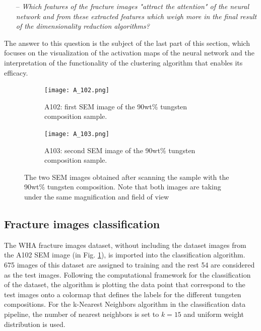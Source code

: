\documentclass[authoryear,preprint,review,12pt, singleside]{elsarticle}
\begin{document}
\begin{itemize}
	\item[--] \textit{Which features of the fracture images "attract the attention" of the neural network and from these extracted features which weigh more in the final result of the dimensionality reduction algorithms?}
\end{itemize}
     
The answer to this question is the subject of the last part of this section, which focuses on the visualization of the activation maps of the neural network and the interpretation of the functionality of the clustering algorithm that enables its efficacy.


\begin{figure}[!h]
	\centering
	\begin{subfigure}[b]{0.49\textwidth}
		\centering
		\texttt{[image: A\_102.png]}
		\caption{A102: first SEM image of the 90wt\% tungsten composition sample.}
		\label{fig:A_102}
	\end{subfigure}
	\begin{subfigure}[b]{0.49\textwidth}
		\centering
		\texttt{[image: A\_103.png]}
		\caption{A103: second SEM image of the 90wt\% tungsten composition sample.}
		\label{fig:A_103}
	\end{subfigure}
	\caption{The two SEM images obtained after scanning the sample with the 90wt\% tungsten composition. Note that both images are taking under the same magnification and field of view}
	\label{fig:se}
\end{figure}

  

\subsection{Fracture images classification}

The WHA fracture images dataset, without including the dataset images from the A102 SEM image (in Fig. \ref{fig:A_102}), is imported into the classification algorithm. 675 images of this dataset are assigned to training and the rest 54 are considered as the test images. Following the computational framework for the classification of the dataset, the algorithm is plotting the data point that correspond to the test images onto a colormap that defines the labels for the different tungsten compositions. For the k-Nearest Neighbors algorithm in the classification data pipeline, the number of nearest neighbors is set to $k=15$ and uniform weight distribution is used.
\end{document}
